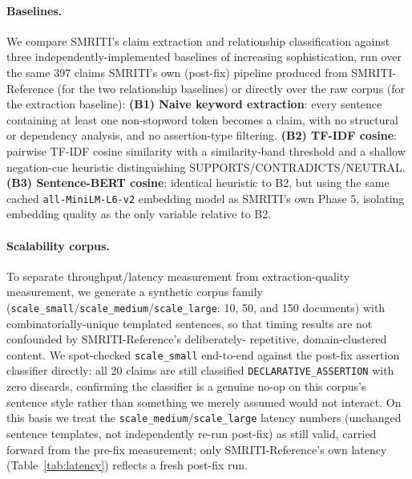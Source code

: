 \paragraph{Baselines.} We compare SMRITI's claim extraction and
relationship classification against three independently-implemented
baselines of increasing sophistication, run over the same 397 claims
SMRITI's own (post-fix) pipeline produced from SMRITI-Reference (for the
two relationship baselines) or directly over the raw corpus (for the
extraction baseline): \textbf{(B1) Naive keyword extraction}: every
sentence containing at least one non-stopword token becomes a claim, with
no structural or dependency analysis, and no assertion-type filtering.
\textbf{(B2) TF-IDF cosine}: pairwise TF-IDF cosine similarity with a
similarity-band threshold and a shallow negation-cue heuristic
distinguishing SUPPORTS/CONTRADICTS/NEUTRAL. \textbf{(B3) Sentence-BERT
cosine}: identical heuristic to B2, but using the same cached
\texttt{all-MiniLM-L6-v2} embedding model as SMRITI's own Phase 5,
isolating embedding quality as the only variable relative to B2.

\paragraph{Scalability corpus.} To separate throughput/latency measurement
from extraction-quality measurement, we generate a synthetic corpus family
(\texttt{scale\_small}/\texttt{scale\_medium}/\texttt{scale\_large}: 10,
50, and 150 documents) with combinatorially-unique templated sentences, so
that timing results are not confounded by SMRITI-Reference's deliberately-
repetitive, domain-clustered content. We spot-checked \texttt{scale\_small}
end-to-end against the post-fix assertion classifier directly: all 20
claims are still classified \texttt{DECLARATIVE\_ASSERTION} with zero
discards, confirming the classifier is a genuine no-op on this corpus's
sentence style rather than something we merely assumed would not interact.
On this basis we treat the \texttt{scale\_medium}/\texttt{scale\_large}
latency numbers (unchanged sentence templates, not independently re-run
post-fix) as still valid, carried forward from the pre-fix measurement;
only SMRITI-Reference's own latency (Table~\ref{tab:latency}) reflects a
fresh post-fix run.
